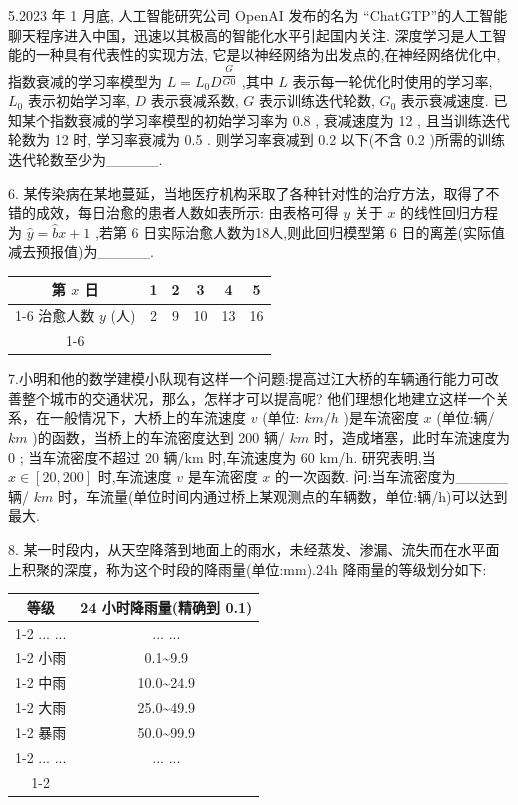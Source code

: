 5.2023 年 1 月底, 人工智能研究公司 OpenAI 发布的名为 “ChatGTP”的人工智能聊天程序进入中国，迅速以其极高的智能化水平引起国内关注. 深度学习是人工智能的一种具有代表性的实现方法, 它是以神经网络为出发点的,在神经网络优化中,指数衰减的学习率模型为 $L = {L}_{0}{D}^{\dfrac{G}{G0}}$ ,其中 $L$ 表示每一轮优化时使用的学习率, ${L}_{0}$ 表示初始学习率, $D$ 表示衰减系数, $G$ 表示训练迭代轮数, ${G}_{0}$ 表示衰减速度. 已知某个指数衰减的学习率模型的初始学习率为 0.8 , 衰减速度为 12 , 且当训练迭代轮数为 12 时, 学习率衰减为 0.5 . 则学习率衰减到 0.2 以下(不含 0.2 )所需的训练迭代轮数至少为\_\_\_\_\_.

6. 某传染病在某地蔓延，当地医疗机构采取了各种针对性的治疗方法，取得了不错的成效，每日治愈的患者人数如表所示: 由表格可得 $y$ 关于 $x$ 的线性回归方程为 $\widehat{y} = \widehat{b}x + 1$ ,若第 6 日实际治愈人数为18人,则此回归模型第 6 日的离差(实际值减去预报值)为\_\_\_\_\_.

\begin{center}
\begin{tabular}{|c|c|c|c|c|c|}
\hline
第 $x$ 日 & 1 & 2 & 3 & 4 & 5 \\
\cline{1-6}
治愈人数 $y$ (人) & 2 & 9 & 10 & 13 & 16 \\
\cline{1-6}
\hline
\end{tabular}
\end{center}

7.小明和他的数学建模小队现有这样一个问题:提高过江大桥的车辆通行能力可改善整个城市的交通状况，那么，怎样才可以提高呢? 他们理想化地建立这样一个关系，在一般情况下，大桥上的车流速度 $v$ (单位: ${k}{m}/{h}$ )是车流密度 $x$ (单位:辆/ ${{km}}$ )的函数，当桥上的车流密度达到 200 辆/ ${{km}}$ 时，造成堵塞，此时车流速度为 0 ; 当车流密度不超过 20 辆/km 时,车流速度为 60 km/h. 研究表明,当 $x \in  \left\lbrack  {{20},{200}}\right\rbrack$ 时,车流速度 $v$ 是车流密度 $x$ 的一次函数. 问:当车流密度为\_\_\_\_\_辆/ ${{km}}$ 时，车流量(单位时间内通过桥上某观测点的车辆数，单位:辆/h)可以达到最大.

8. 某一时段内，从天空降落到地面上的雨水，未经蒸发、渗漏、流失而在水平面上积聚的深度，称为这个时段的降雨量(单位:mm).24h 降雨量的等级划分如下:

\begin{center}
\begin{tabular}{|c|c|}
\hline
等级 & 24 小时降雨量(精确到 0.1) \\
\cline{1-2}
... ... & ... ... \\
\cline{1-2}
小雨 & 0.1\textasciitilde 9.9 \\
\cline{1-2}
中雨 & 10.0\textasciitilde 24.9 \\
\cline{1-2}
大雨 & 25.0\textasciitilde 49.9 \\
\cline{1-2}
暴雨 & 50.0\textasciitilde 99.9 \\
\cline{1-2}
... ... & ... ... \\
\cline{1-2}
\hline
\end{tabular}
\end{center}

